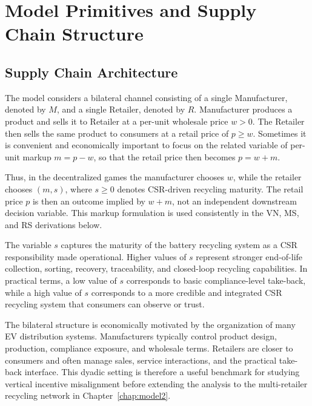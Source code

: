 \section{Model Primitives and Supply Chain Structure}
\label{sec:model_primitives}

\subsection{Supply Chain Architecture}

The model considers a bilateral channel consisting of a single Manufacturer, denoted by $M$, and a single Retailer, denoted by $R$. Manufacturer produces a product and sells it to Retailer at a per-unit wholesale price $w>0$. The Retailer then sells the same product to consumers at a retail price of $p \geq w $. Sometimes it is convenient and economically important to focus on the related variable of per-unit markup   $m = p-w$, so that the retail price then becomes  $p = w+m.$

Thus, in the decentralized games the manufacturer chooses $w$, while the retailer chooses $(m,s)$, where $s\geq 0$ denotes CSR-driven recycling maturity. The retail price $p$ is then an outcome implied by $w+m$, not an independent downstream decision variable. This markup formulation is used consistently in the VN, MS, and RS derivations below.

The variable $s$ captures the maturity of the battery recycling system as a CSR responsibility made operational. Higher values of $s$ represent stronger end-of-life collection, sorting, recovery, traceability, and closed-loop recycling capabilities. In practical terms, a low value of $s$ corresponds to basic compliance-level take-back, while a high value of $s$ corresponds to a more credible and integrated CSR recycling system that consumers can observe or trust.

The bilateral structure is economically motivated by the organization of many EV distribution systems. Manufacturers typically control product design, production, compliance exposure, and wholesale terms. Retailers are closer to consumers and often manage sales, service interactions, and the practical take-back interface. This dyadic setting is therefore a useful benchmark for studying vertical incentive misalignment before extending the analysis to the multi-retailer recycling network in Chapter~\ref{chap:model2}.


